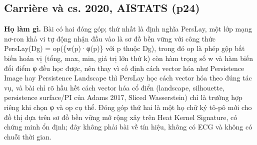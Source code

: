 \documentclass[12pt,a4paper]{article}
\begin{document}
\subsection{Carrière và cs. 2020, AISTATS \normalfont\small (p24)}
\par\vspace{2pt}
\par\vspace{4pt}
\noindent \textbf{Họ làm gì.} Bài có hai đóng góp; thứ nhất là định nghĩa PersLay, một lớp mạng nơ-ron khả vi tự động nhận đầu vào là sơ đồ bền vững với công thức PersLay(Dg) = op(\{w(p)·φ(p)\} với p thuộc Dg), trong đó op là phép gộp bất biến hoán vị (tổng, max, min, giá trị lớn thứ k) còn hàm trọng số w và hàm biến đổi điểm φ đều học được, nên thay vì cố định cách vector hóa như Persistence Image hay Persistence Landscape thì PersLay học cách vector hóa theo đúng tác vụ, và bài chỉ rõ hầu hết cách vector hóa cổ điển (landscape, silhouette, persistence surface/PI của Adams 2017, Sliced Wasserstein) chỉ là trường hợp riêng khi chọn φ và op cụ thể. Đóng góp thứ hai là một họ chữ ký tô-pô mới cho đồ thị dựa trên sơ đồ bền vững mở rộng xây trên Heat Kernel Signature, có chứng minh ổn định; đây không phải bài về tín hiệu, không có ECG và không có chuỗi thời gian.\par\vspace{3pt}
\end{document}
